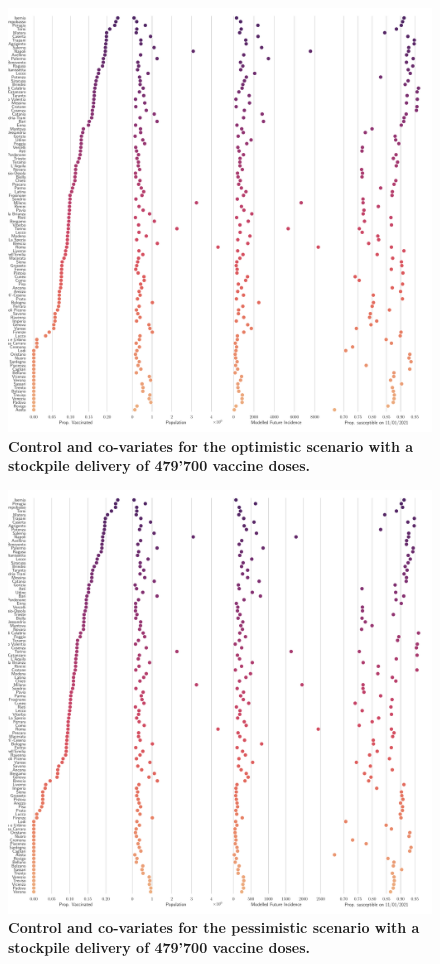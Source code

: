 \begin{figure}[!ht]
    \centering
    \includegraphics[width=\textwidth]{fig_italy-ocp/figuresSI/SI_scatter_Optimistic.pdf}
    \caption[Control and co-variates for the optimistic scenario]{\textbf{Control and co-variates for the optimistic scenario with a stockpile delivery of 479'700 vaccine doses.}}
    \label{fig:OC_scatter_optimistic}
\end{figure}

\begin{figure}[!ht]
    \centering
    \includegraphics[width=\textwidth]{fig_italy-ocp/figuresSI/SI_scatter_Pessimistic.pdf}
    \caption[Control and co-variates for the pessimistic scenario]{\textbf{Control and co-variates for the pessimistic scenario with a stockpile delivery of 479'700 vaccine doses.}}
    \label{fig:OC_scatter_pessimistic}
\end{figure}

